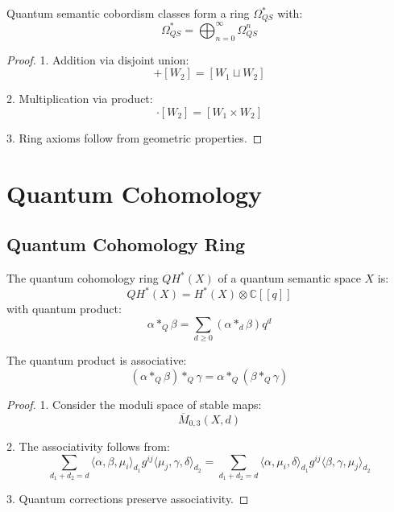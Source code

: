 \documentclass[12pt]{article}
\begin{document}
\begin{theorem}
Quantum semantic cobordism classes form a ring $Ω_{QS}^*$ with:
\begin{equation}
Ω_{QS}^* = \bigoplus_{n=0}^{\infty} Ω_{QS}^n
\end{equation}
\end{theorem}

\begin{proof}
1. Addition via disjoint union:
\begin{equation}
[W_1] + [W_2] = [W_1 \sqcup W_2]
\end{equation}

2. Multiplication via product:
\begin{equation}
[W_1] \cdot [W_2] = [W_1 \times W_2]
\end{equation}

3. Ring axioms follow from geometric properties.
\end{proof}

\section{Quantum Cohomology}

\subsection{Quantum Cohomology Ring}

\begin{definition}
The quantum cohomology ring $QH^*(X)$ of a quantum semantic space $X$ is:
\begin{equation}
QH^*(X) = H^*(X) \otimes \mathbb{C}[[q]]
\end{equation}
with quantum product:
\begin{equation}
α *_{Q} β = \sum_{d≥0} (α *_d β)q^d
\end{equation}
\end{definition}

\begin{theorem}
The quantum product is associative:
\begin{equation}
(α *_{Q} β) *_{Q} γ = α *_{Q} (β *_{Q} γ)
\end{equation}
\end{theorem}

\begin{proof}
1. Consider the moduli space of stable maps:
\begin{equation}
\overline{M}_{0,3}(X,d)
\end{equation}

2. The associativity follows from:
\begin{equation}
\sum_{d_1+d_2=d} ⟨α,β,μ_i⟩_{d_1} g^{ij} ⟨μ_j,γ,δ⟩_{d_2} = \sum_{d_1+d_2=d} ⟨α,μ_i,δ⟩_{d_1} g^{ij} ⟨β,γ,μ_j⟩_{d_2}
\end{equation}

3. Quantum corrections preserve associativity.
\end{proof}
\end{document}
